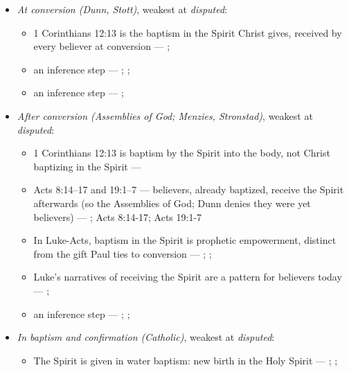 \documentclass[11pt]{article}
\begin{document}
\begin{itemize}
\item \emph{At conversion (Dunn, Stott)}, weakest at \emph{disputed}:
\begin{itemize}
\item 1 Corinthians 12:13 is the baptism in the Spirit Christ gives, received by every believer at conversion --- \cite{dunn-baptism-holy-spirit-1970}; \cite{stott-baptism-fullness-1975}
\item an inference step --- \cite{dunn-baptism-holy-spirit-1970}; \cite{stott-baptism-fullness-1975}; \cite{assemblies-of-god-baptism-holy-spirit-2010}
\item an inference step --- \cite{menzies-lukes-understanding-2017}; \cite{menzies-empowered-witness-1994}
\end{itemize}
\item \emph{After conversion (Assemblies of God; Menzies, Stronstad)}, weakest at \emph{disputed}:
\begin{itemize}
\item 1 Corinthians 12:13 is baptism by the Spirit into the body, not Christ baptizing in the Spirit --- \cite{assemblies-of-god-baptism-holy-spirit-2010}
\item Acts 8:14–17 and 19:1–7 — believers, already baptized, receive the Spirit afterwards (so the Assemblies of God; Dunn denies they were yet believers) --- \cite{assemblies-of-god-baptism-holy-spirit-2010}; Acts 8:14-17; Acts 19:1-7
\item In Luke-Acts, baptism in the Spirit is prophetic empowerment, distinct from the gift Paul ties to conversion --- \cite{menzies-lukes-understanding-2017}; \cite{menzies-empowered-witness-1994}; \cite{stronstad-charismatic-theology-1984}
\item Luke’s narratives of receiving the Spirit are a pattern for believers today --- \cite{stronstad-charismatic-theology-1984}; \cite{assemblies-of-god-baptism-holy-spirit-2010}
\item an inference step --- \cite{assemblies-of-god-baptism-holy-spirit-2010}; \cite{dunn-baptism-holy-spirit-1970}; \cite{stott-baptism-fullness-1975}
\end{itemize}
\item \emph{In baptism and confirmation (Catholic)}, weakest at \emph{disputed}:
\begin{itemize}
\item The Spirit is given in water baptism: new birth in the Holy Spirit --- \cite[1262]{catholic-church-catechism-2000}; \cite[1265]{catholic-church-catechism-2000}; \cite[Small Catechism, Baptism, third part]{kolb-wengert-book-of-concord-2000}

\end{itemize}
\end{itemize}
\end{document}
